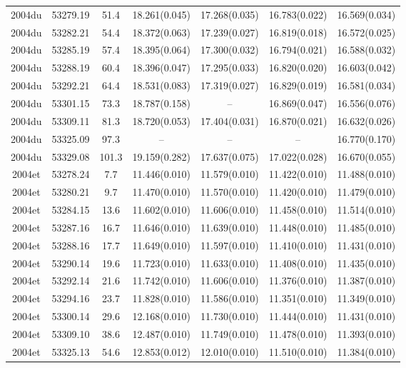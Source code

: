 \begin{table*}
\begin{tabular}{ccccccc}
2004du	  & 53279.19	 & 51.4	& 18.261(0.045)	 & 17.268(0.035)	 & 16.783(0.022)	 & 16.569(0.034) \\ 
2004du	  & 53282.21	 & 54.4	& 18.372(0.063)	 & 17.239(0.027)	 & 16.819(0.018)	 & 16.572(0.025) \\ 
2004du	  & 53285.19	 & 57.4	& 18.395(0.064)	 & 17.300(0.032)	 & 16.794(0.021)	 & 16.588(0.032) \\ 
2004du	  & 53288.19	 & 60.4	& 18.396(0.047)	 & 17.295(0.033)	 & 16.820(0.020)	 & 16.603(0.042) \\ 
2004du	  & 53292.21	 & 64.4	& 18.531(0.083)	 & 17.319(0.027)	 & 16.829(0.019)	 & 16.581(0.034) \\ 
2004du	  & 53301.15	 & 73.3	& 18.787(0.158)	 & --	 & 16.869(0.047)	 & 16.556(0.076) \\ 
2004du	  & 53309.11	 & 81.3	& 18.720(0.053)	 & 17.404(0.031)	 & 16.870(0.021)	 & 16.632(0.026) \\ 
2004du	  & 53325.09	 & 97.3	& --	 & --	 & --	 & 16.770(0.170) \\ 
2004du	  & 53329.08	 & 101.3	& 19.159(0.282)	 & 17.637(0.075)	 & 17.022(0.028)	 & 16.670(0.055) \\ 
2004et	  & 53278.24	 & 7.7	& 11.446(0.010)	 & 11.579(0.010)	 & 11.422(0.010)	 & 11.488(0.010) \\ 
2004et	  & 53280.21	 & 9.7	& 11.470(0.010)	 & 11.570(0.010)	 & 11.420(0.010)	 & 11.479(0.010) \\ 
2004et	  & 53284.15	 & 13.6	& 11.602(0.010)	 & 11.606(0.010)	 & 11.458(0.010)	 & 11.514(0.010) \\ 
2004et	  & 53287.16	 & 16.7	& 11.646(0.010)	 & 11.639(0.010)	 & 11.448(0.010)	 & 11.485(0.010) \\ 
2004et	  & 53288.16	 & 17.7	& 11.649(0.010)	 & 11.597(0.010)	 & 11.410(0.010)	 & 11.431(0.010) \\ 
2004et	  & 53290.14	 & 19.6	& 11.723(0.010)	 & 11.633(0.010)	 & 11.408(0.010)	 & 11.435(0.010) \\ 
2004et	  & 53292.14	 & 21.6	& 11.742(0.010)	 & 11.606(0.010)	 & 11.376(0.010)	 & 11.387(0.010) \\ 
2004et	  & 53294.16	 & 23.7	& 11.828(0.010)	 & 11.586(0.010)	 & 11.351(0.010)	 & 11.349(0.010) \\ 
2004et	  & 53300.14	 & 29.6	& 12.168(0.010)	 & 11.730(0.010)	 & 11.444(0.010)	 & 11.431(0.010) \\ 
2004et	  & 53309.10	 & 38.6	& 12.487(0.010)	 & 11.749(0.010)	 & 11.478(0.010)	 & 11.393(0.010) \\ 
2004et	  & 53325.13	 & 54.6	& 12.853(0.012)	 & 12.010(0.010)	 & 11.510(0.010)	 & 11.384(0.010) \\ 

\end{tabular}
\end{table*}
